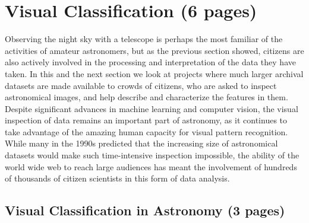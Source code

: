 \documentclass{ar2e}
\begin{document}




\section{Visual Classification (6 pages)}
\label{sec:class}

Observing the night sky with a telescope is perhaps the most familiar of the
activities of amateur astronomers, but as the previous section showed, citizens
are also actively involved in the processing and interpretation of the data they
have taken.  In this and the next section we look at projects where much larger
archival datasets are made available to crowds of citizens, who are asked to
inspect astronomical images, and help describe and characterize the features in
them. Despite significant advances in machine learning and computer vision, the
visual inspection of data remains an important part of astronomy, as it
continues to take advantage of the amazing human capacity for visual pattern
recognition. While many in the 1990s predicted that the increasing size of
astronomical datasets would make such time-intensive inspection impossible, the
ability of the world wide web to reach large audiences has meant the involvement
of hundreds of thousands of citizen scientists in this form of data analysis.  



\subsection{Visual Classification in Astronomy (3 pages)}
\label{sec:class:astro}
\end{document}
